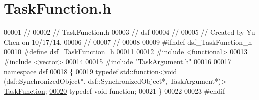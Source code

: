 \hypertarget{_task_function_8h_source}{}\section{Task\+Function.\+h}
\label{_task_function_8h_source}

\begin{DoxyCode}
00001 \textcolor{comment}{//}
00002 \textcolor{comment}{//  TaskFunction.h}
00003 \textcolor{comment}{//  dsf}
00004 \textcolor{comment}{//}
00005 \textcolor{comment}{//  Created by Yu Chen on 10/17/14.}
00006 \textcolor{comment}{//}
00007 \textcolor{comment}{//}
00008 
00009 \textcolor{preprocessor}{#ifndef dsf\_TaskFunction\_h}
00010 \textcolor{preprocessor}{#define dsf\_TaskFunction\_h}
00011 
00012 \textcolor{preprocessor}{#include <functional>}
00013 \textcolor{preprocessor}{#include <vector>}
00014 
00015 \textcolor{preprocessor}{#include "TaskArgument.h"}
00016 
00017 \textcolor{keyword}{namespace }\hyperlink{namespacedsf}{dsf}
00018 \{
\hypertarget{_task_function_8h_source_l00019}{}\hyperlink{namespacedsf_aa16e735f29587f4485b56fc46746f7a9}{00019}     \textcolor{keyword}{typedef} std::function<void (dsf::SynchronizedObject*, dsf::SynchronizedObject*, TaskArgument*)> 
      \hyperlink{namespacedsf_aa16e735f29587f4485b56fc46746f7a9}{TaskFunction};
\hypertarget{_task_function_8h_source_l00020}{}\hyperlink{namespacedsf_a3ad20407a44eaf5ce4cf784a60c1b92b}{00020}     \textcolor{keyword}{typedef} \textcolor{keywordtype}{void} \textcolor{keyword}{function};
00021 \}
00022 
00023 \textcolor{preprocessor}{#endif}
\end{DoxyCode}
